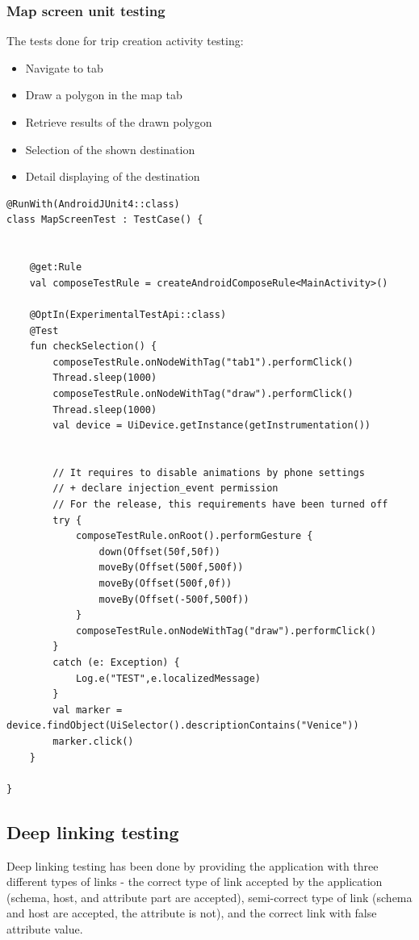 \subsubsection{Map screen unit testing}
The tests done for trip creation activity testing:
\begin{itemize}
\item Navigate to tab
\item Draw a polygon in the map tab
\item Retrieve results of the drawn polygon
\item Selection of the shown destination
\item Detail displaying of the destination
\end{itemize}
\begin{verbatim}
@RunWith(AndroidJUnit4::class)
class MapScreenTest : TestCase() {


    @get:Rule
    val composeTestRule = createAndroidComposeRule<MainActivity>()

    @OptIn(ExperimentalTestApi::class)
    @Test
    fun checkSelection() {
        composeTestRule.onNodeWithTag("tab1").performClick()
        Thread.sleep(1000)
        composeTestRule.onNodeWithTag("draw").performClick()
        Thread.sleep(1000)
        val device = UiDevice.getInstance(getInstrumentation())


        // It requires to disable animations by phone settings
        // + declare injection_event permission
        // For the release, this requirements have been turned off
        try {
            composeTestRule.onRoot().performGesture {
                down(Offset(50f,50f))
                moveBy(Offset(500f,500f))
                moveBy(Offset(500f,0f))
                moveBy(Offset(-500f,500f))
            }
            composeTestRule.onNodeWithTag("draw").performClick()
        }
        catch (e: Exception) {
            Log.e("TEST",e.localizedMessage)
        }
        val marker = device.findObject(UiSelector().descriptionContains("Venice"))
        marker.click()
    }

}

\end{verbatim}
\newpage
\subsection{Deep linking testing}
\hspace{\parindent}Deep linking testing has been done by providing the application with three different types of links - the correct type of link accepted by the application (schema, host, and attribute part are accepted), semi-correct type of link (schema and host are accepted, the attribute is not), and the correct link with false attribute value.\\ \\

